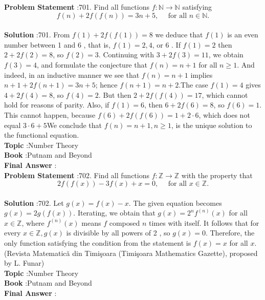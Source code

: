 \documentclass[10pt]{article}
\begin{document}
\textbf{Problem Statement} :701. Find all functions $f: \mathbb{N} \rightarrow \mathbb{N}$ satisfying$$ f(n)+2 f(f(n))=3 n+5, \quad \text { for all } n \in \mathbb{N} . $$\\
\textbf{Solution} :701. From $f(1)+2 f(f(1))=8$ we deduce that $f(1)$ is an even number between 1 and 6 , that is, $f(1)=2,4$, or 6 . If $f(1)=2$ then $2+2 f(2)=8$, so $f(2)=3$. Continuing with $3+2 f(3)=11$, we obtain $f(3)=4$, and formulate the conjecture that $f(n)=n+1$ for all $n \geq 1$. And indeed, in an inductive manner we see that $f(n)=n+1$ implies $n+1+2 f(n+1)=3 n+5$; hence $f(n+1)=n+2$.The case $f(1)=4$ gives $4+2 f(4)=8$, so $f(4)=2$. But then $2+2 f(f(4))=17$, which cannot hold for reasons of parity. Also, if $f(1)=6$, then $6+2 f(6)=8$, so $f(6)=1$. This cannot happen, because $f(6)+2 f(f(6))=1+2 \cdot 6$, which does not equal $3 \cdot 6+5$We conclude that $f(n)=n+1, n \geq 1$, is the unique solution to the functional equation.\\
\textbf{Topic} :Number Theory\\
\textbf{Book} :Putnam and Beyond\\
\textbf{Final Answer} :\\


\textbf{Problem Statement} :702. Find all functions $f: \mathbb{Z} \rightarrow \mathbb{Z}$ with the property that$$ 2 f(f(x))-3 f(x)+x=0, \quad \text { for all } x \in \mathbb{Z} . $$\\
\textbf{Solution} :702. Let $g(x)=f(x)-x$. The given equation becomes $g(x)=2 g(f(x))$. Iterating, we obtain that $g(x)=2^{n} f^{(n)}(x)$ for all $x \in \mathbb{Z}$, where $f^{(n)}(x)$ means $f$ composed $n$ times with itself. It follows that for every $x \in \mathbb{Z}, g(x)$ is divisible by all powers of 2 , so $g(x)=0$. Therefore, the only function satisfying the condition from the statement is $f(x)=x$ for all $x$.(Revista Matematică din Timişoara (Timişoara Mathematics Gazette), proposed by L. Funar)\\
\textbf{Topic} :Number Theory\\
\textbf{Book} :Putnam and Beyond\\
\textbf{Final Answer} :\\
\end{document}
